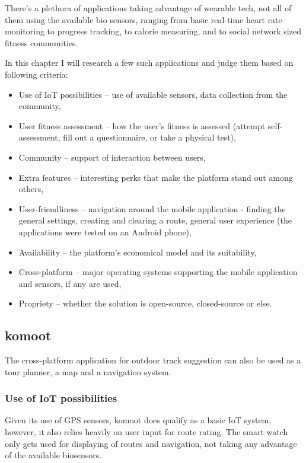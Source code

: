 There's a plethora of applications taking advantage of wearable tech, not all of them using the available bio sensors, ranging from basic real-time heart rate monitoring to progress tracking, to calorie measuring, and to social network sized fitness communities.

In this chapter I will research a few such applications and judge them based on following criteria:
\begin{itemize}
    \item Use of IoT possibilities -- use of available sensors, data collection from the community,
    \item User fitness assessment -- how the user's fitness is assessed (attempt self-assessment, fill out a questionnaire, or take a physical test),
    \item Community -- support of interaction between users,
    \item Extra features -- interesting perks that make the platform stand out among others,
    \item User-friendliness -- navigation around the mobile application - finding the general settings, creating and clearing a route, general user experience (the applications were tested on an Android phone),
    \item Availability -- the platform's economical model and its suitability,
    \item Cross-platform -- major operating systems supporting the mobile application and sensors, if any are used,
    \item Propriety -- whether the solution is open-source, closed-source or else.
\end{itemize}

\subsection{komoot}
The cross-platform application for outdoor track suggestion can also be used as a tour planner, a map and a navigation system.

\subsubsection*{Use of IoT possibilities}
Given its use of GPS sensors, komoot does qualify as a basic IoT system, however, it also relies heavily on user input for route rating.
The smart watch only gets used for displaying of routes and navigation, not taking any advantage of the available biosensors.
